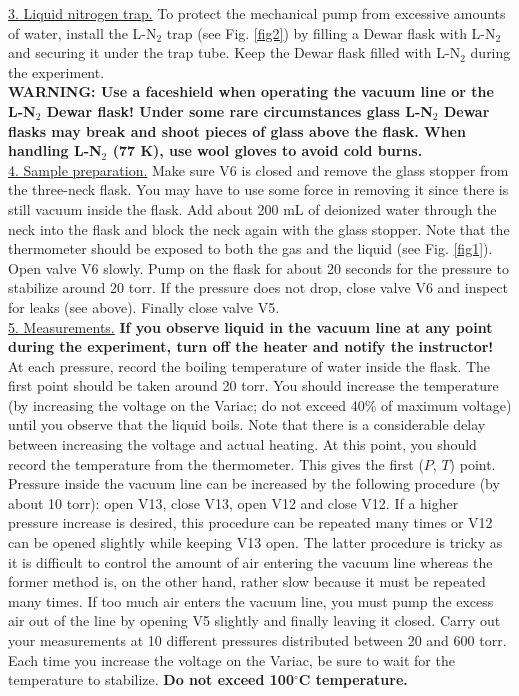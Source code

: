 \documentclass[byrevtex,amssymb,aps,pra,floatfix,letterpaper]{revtex4}
\newcommand{\degree}[0]{$^\circ$}
\begin{document}
\noindent
\underline{3. Liquid nitrogen trap.} To protect the mechanical pump from excessive amounts of water, install the L-N$_2$ trap (see Fig. \ref{fig2}) by filling a Dewar flask with L-N$_2$ and securing it under the trap tube. Keep the Dewar flask filled with L-N$_2$ during the experiment.\\

\noindent
\textbf{WARNING: Use a faceshield when operating the vacuum line or the L-N$_2$ Dewar flask! Under some rare circumstances glass L-N$_2$ Dewar flasks may break and shoot pieces of glass above the flask. When handling L-N$_2$ (77 K), use wool gloves to avoid cold burns.}\\

\noindent
\underline{4. Sample preparation.} Make sure V6 is closed and remove the glass stopper from the three-neck flask. You may have to use some force in removing it since there is still vacuum inside the flask. Add about 200 mL of deionized water through the neck into the flask and block the neck again with the glass stopper. Note that the thermometer should be exposed to both the gas and the liquid (see Fig. \ref{fig1}). Open valve V6 slowly. Pump on the flask for about 20 seconds for the pressure to stabilize around 20 torr. If the pressure does not drop, close valve V6 and inspect for leaks (see above). Finally close valve V5.\\

\noindent
\underline{5. Measurements.} \textbf{If you observe liquid in the vacuum line at any point during the experiment, turn off the heater and  notify the instructor!} At each pressure, record the boiling temperature of water inside the flask. The first point should be taken around 20 torr. You should increase the temperature  (by increasing the voltage on the Variac; do not exceed 40\% of maximum voltage) until you observe that the liquid boils. Note that there is a considerable delay between increasing the voltage and actual heating. At this point, you should record the temperature from the thermometer. This gives the  first ($P$, $T$) point. Pressure inside the vacuum line can be increased  by the following procedure (by about 10 torr): open V13, close V13, open V12 and close V12. If a higher pressure increase is desired, this procedure can be repeated many times or V12 can be opened slightly while keeping V13 open. The latter procedure is tricky as it is difficult to control the amount of air entering the vacuum line whereas the former method is, on the other hand, rather slow because it must be repeated many times. If too much air enters the vacuum line, you must pump the excess air out of the line by opening V5 slightly and finally leaving it closed. Carry out your measurements at 10 different pressures distributed between 20 and 600 torr. Each time you increase the voltage on the Variac, be sure to wait for the temperature to stabilize. \textbf{Do not exceed 100\degree C temperature.}\\
\end{document}
